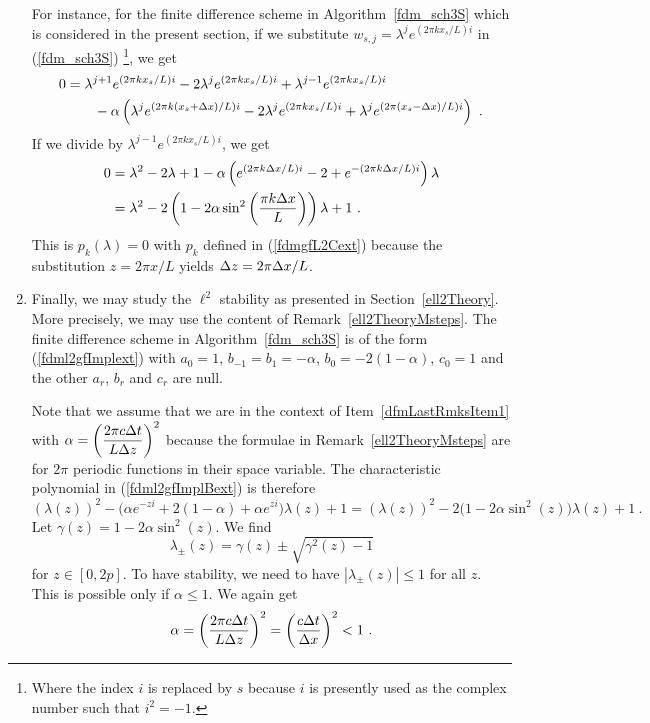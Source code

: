 \begin{rmkList}
\begin{enumerate}
For instance, for the finite difference scheme in
Algorithm~\ref{fdm_sch3S} which is considered in the present section,
if we substitute $\displaystyle w_{s,j} = \lambda^j e^{(2\pi k x_s/L) i}$
in (\ref{fdm_sch3S}) \footnote{Where the index $i$ is replaced by $s$
because $i$ is presently used as the complex number such that
$i^2=-1$.}, we get
\begin{align*}
0 & = \lambda^{j+1} e^{(2\pi k x_s/L) i}
- 2 \lambda^j e^{(2\pi k x_s/L) i} + \lambda^{j-1} e^{(2\pi k x_s/L) i} \\
&\qquad - \alpha \left( \lambda^j e^{(2\pi k(x_s +\Delta{x})/L) i}
- 2 \lambda^j e^{(2\pi k x_s/L) i}
+ \lambda^j e^{(2\pi (x_s-\Delta{x})/L) i} \right) \ .
\end{align*}
If we divide by $\displaystyle \lambda^{j-1} e^{(2\pi k x_s/L) i}$, we get
\begin{align}
0 & = \lambda^2 - 2 \lambda + 1 - \alpha \left( e^{(2\pi k \Delta{x}/L) i} - 2
+ e^{-(2\pi k \Delta{x}/L) i} \right) \lambda \nonumber \\
& = \lambda^2 - 2 \left(1 - 2 \alpha \sin^2\left( \frac{\pi k \Delta{x}}{L}\right)
\right) \lambda + 1 \ . \label{sch3D_EigRoot}
\end{align}
This is $p_k(\lambda) = 0$ with $p_k$ defined in (\ref{fdmgfL2Cext})
because the substitution $z = 2\pi x /L$ yields
$\displaystyle \Delta{z} =  2 \pi \Delta{x}/L$.
\item Finally, we may study the $\ell^2$ stability as presented in
Section~\ref{ell2Theory}.  More precisely, we may use the content of
Remark~\ref{ell2TheoryMsteps}.  The finite difference scheme in
Algorithm~\ref{fdm_sch3S} is of the form (\ref{fdml2gfImplext}) with
$a_0 =1$, $b_{-1}= b_1 = -\alpha$, $b_0 = -2(1-\alpha)$, $c_0 = 1$ and
the other $a_r$, $b_r$ and $c_r$ are null.    \label{dfmLastRmksItem4}

Note that we assume that we are in the context of
Item~\ref{dfmLastRmksItem1} with 
$\displaystyle \alpha = \left(\frac{2\pi c \Delta{t}}{L \Delta{z}}\right)^2$
because the formulae in Remark~\ref{ell2TheoryMsteps} are for $2\pi$
periodic functions in their space variable.  The characteristic
polynomial in (\ref{fdml2gfImplBext}) is therefore
\[
\left(\lambda(z)\right)^2 - \big(\alpha e^{-zi} + 2(1-\alpha) +
\alpha e^{zi}\big) \lambda(z) + 1
= \left(\lambda(z)\right)^2 - 2\big(1 -2 \alpha \sin^2(z)\big)
\lambda(z) + 1 \ .
\]
Let $\displaystyle \gamma(z) = 1 -2 \alpha \sin^2(z)$.  We find
\[
  \lambda_{\pm}(z) = \gamma(z) \pm \sqrt{\gamma^2(z)-1}
\]
for $z \in [0,2p]$.  To have stability, we need to have
$|\lambda_{\pm}(z)| \leq 1$ for all $z$.  This is possible only if
$\alpha \leq 1$.   We again get
\[
  \alpha = \left(\frac{2\pi c \dtx{t}}{L \dtx{z}}\right)^2
  = \left( \frac{c \dtx{t}}{\dtx{x}}\right)^2 < 1 \ .
\]
\end{enumerate}
\end{rmkList}

